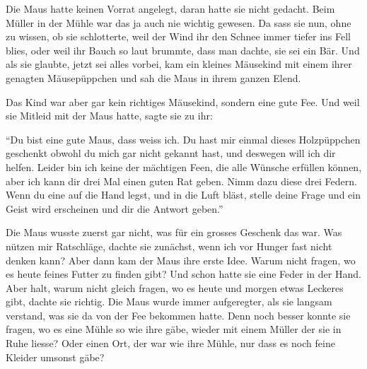 Die Maus hatte keinen Vorrat angelegt, daran hatte sie nicht gedacht. Beim Müller in der Mühle war das ja auch nie wichtig gewesen. Da sass sie nun, ohne zu wissen, ob sie schlotterte, weil der Wind ihr den Schnee immer tiefer ins Fell blies, oder weil ihr Bauch so laut brummte, dass man dachte, sie sei ein Bär. Und als sie glaubte, jetzt sei alles vorbei, kam ein kleines Mäusekind mit einem ihrer genagten Mäusepüppchen und sah die Maus in ihrem ganzen Elend.

Das Kind war aber gar kein richtiges Mäusekind, sondern eine gute Fee. Und weil sie Mitleid mit der Maus hatte, sagte sie zu ihr: 

\enquote{Du bist eine gute Maus, dass weiss ich. Du hast mir einmal dieses Holzpüppchen geschenkt obwohl du mich gar nicht gekannt hast, und deswegen will ich dir helfen. Leider bin ich keine der mächtigen Feen, die alle Wünsche erfüllen können, aber ich kann dir drei Mal einen guten Rat geben. Nimm dazu diese drei Federn. Wenn du eine auf die Hand legst, und in die Luft bläst, stelle deine Frage und ein Geist wird erscheinen und dir die Antwort geben.}

Die Maus wusste zuerst gar nicht, was für ein grosses Geschenk das war. Was nützen mir Ratschläge, dachte sie zunächst, wenn ich vor Hunger fast nicht denken kann? Aber dann kam der Maus ihre erste Idee. Warum nicht fragen, wo es heute feines Futter zu finden gibt? Und schon hatte sie eine Feder in der Hand. Aber halt, warum nicht gleich fragen, wo es heute und morgen etwas Leckeres gibt, dachte sie richtig. Die Maus wurde immer aufgeregter, als sie langsam verstand, was sie da von der Fee bekommen hatte. Denn noch besser konnte sie fragen, wo es eine Mühle so wie ihre gäbe, wieder mit einem Müller der sie in Ruhe liesse? Oder einen Ort, der war wie ihre Mühle, nur dass es noch feine Kleider umsonst gäbe?

